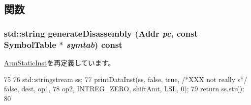 \subsection{関数}
\hypertarget{classArmISA_1_1DataXERegOp_a95d323a22a5f07e14d6b4c9385a91896}{
\subsubsection[{generateDisassembly}]{\setlength{\rightskip}{0pt plus 5cm}std::string generateDisassembly ({\bf Addr} {\em pc}, \/  const SymbolTable $\ast$ {\em symtab}) const}}
\label{classArmISA_1_1DataXERegOp_a95d323a22a5f07e14d6b4c9385a91896}


\hyperlink{classArmISA_1_1ArmStaticInst_a95d323a22a5f07e14d6b4c9385a91896}{ArmStaticInst}を再定義しています。


\begin{DoxyCode}
75 {
76     std::stringstream ss;
77     printDataInst(ss, false, true, /*XXX not really s*/ false, dest, op1,
78                   op2, INTREG_ZERO, shiftAmt, LSL, 0);
79     return ss.str();
80 }
\end{DoxyCode}


